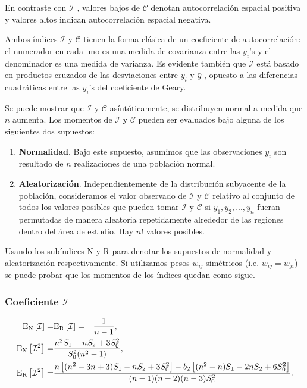 En contraste con $\mathcal{I}$ , valores bajos de $\mathcal{C}$ denotan autocorrelación espacial positiva y valores altos indican autocorrelación espacial negativa.


Ambos índices $\mathcal{I}$ y $\mathcal{C}$ tienen la forma clásica de un coeficiente de autocorrelación: el numerador en cada uno es una medida de covarianza entre las $y_i$'s y el denominador es una medida de varianza. Es evidente también que $\mathcal{I}$  está basado en productos cruzados de las desviaciones entre $y_i$ y $\bar{y}$ , opuesto a las diferencias cuadráticas entre las $y_i$'s del coeficiente de Geary.

Se puede mostrar \citep[Capítulo 2]{clifford1973} que  $\mathcal{I}$ y $\mathcal{C}$ asíntóticamente, se distribuyen normal a medida que $n$ aumenta. Los momentos de $\mathcal{I}$ y $\mathcal{C}$ pueden ser evaluados bajo alguna de los siguientes dos supuestos:

\begin{enumerate}
\item \textbf{Normalidad}. Bajo este supuesto, asumimos que las observaciones $y_i$ son resultado de $n$ realizaciones de una población normal.
\item \textbf{Aleatorización}. Independientemente de la distribución subyacente de la población, consideramos el valor observado de $\mathcal{I}$ y $\mathcal{C}$ relativo al conjunto de todos los valores posibles que pueden tomar $\mathcal{I}$ y $\mathcal{C}$ si $y_1, y_2, ..., y_n$ fueran permutadas de manera aleatoria repetidamente alrededor de las regiones dentro del área de estudio. Hay $n!$ valores posibles.
\end{enumerate}

Usando los subíndices N y R para denotar los supuestos de normalidad y aleatorización respectivamente. Si utilizamos pesos $w_{ij}$ simétricos (i.e. $w_{ij}=w_{ji}$) se puede probar que los momentos de los índices quedan como sigue.

\subsubsection*{Coeficiente $\mathcal{I}$}
\begin{align}
{\rm{E_N}}\left[\mathcal{I} \right]  = &{\rm{E_R}} \left[\mathcal{I}\right]=-\dfrac{1}{n-1},\\
{\rm{E_N}}\left[\mathcal{I}^2\right] = & \dfrac{n^2S_1-nS_2+3S_0^2}{S_0^2(n^2-1)}, \\
{\rm{E_R}}\left[\mathcal{I}^2\right] = &\dfrac{n \left[ (n^2-3n+3)S_1 - nS_2 + 3S_0^2 \right] - b_2 \left[ (n^2 - n)S_1 - 2nS_2 +6S_0^2\right]}{(n-1)(n-2)(n-3)S_0^2}.
\end{align}

